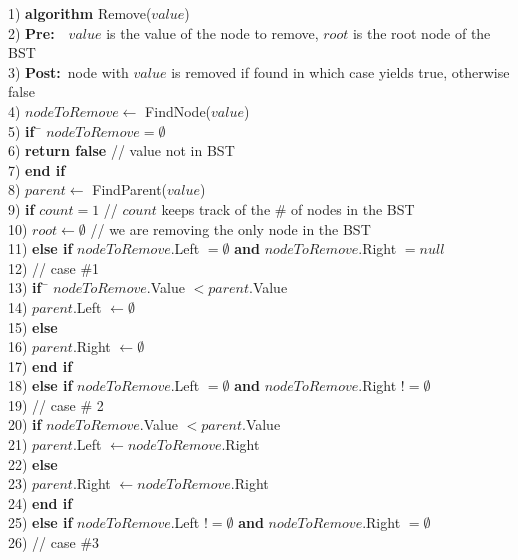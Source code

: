\begin{tabbing}
1)  \textbf{alg}\= \textbf{orithm} Remove($value$) \\
2)  \> \textbf{Pre:}~~$value$ is the value of the node to remove, $root$ is the root node of the BST \\
3)  \> \textbf{Post:}~node with $value$ is removed if found in which case yields true, otherwise false \\
4)  \> $nodeToRemove \leftarrow$ FindNode($value$) \\
5)  \> \textbf{if}~\= $nodeToRemove = \emptyset$ \\
6)  \> \> \textbf{return false} // value not in BST \\
7)  \> \textbf{end if} \\
8)  \> $parent \leftarrow$ FindParent($value$) \\
9)  \> \textbf{if} $count = 1$ // $count$ keeps track of the \# of nodes in the BST \\
10) \> \> $root \leftarrow \emptyset$ // we are removing the only node in the BST \\
11) \> \textbf{else if} $nodeToRemove$.Left $= \emptyset$ \textbf{and} $nodeToRemove$.Right $= null$ \\
12) \> \> // case \#1 \\
13) \> \> \textbf{if}~\= $nodeToRemove$.Value $< parent$.Value \\
14) \> \> \> $parent$.Left $\leftarrow \emptyset$ \\
15) \> \> \textbf{else} \\
16) \> \> \> $parent$.Right $\leftarrow \emptyset$ \\
17) \> \> \textbf{end if} \\
18) \> \textbf{else if} $nodeToRemove$.Left $= \emptyset$ \textbf{and} $nodeToRemove$.Right $!= \emptyset$ \\
19) \> \> // case \# 2 \\
20) \> \> \textbf{if} $nodeToRemove$.Value $< parent$.Value \\
21) \> \> \> $parent$.Left $\leftarrow nodeToRemove$.Right \\
22) \> \> \textbf{else} \\
23) \> \> \> $parent$.Right $\leftarrow nodeToRemove$.Right \\
24) \> \> \textbf{end if} \\
25) \> \textbf{else if} $nodeToRemove$.Left $!= \emptyset$ \textbf{and} $nodeToRemove$.Right $= \emptyset$ \\
26) \> \> // case \#3 \\

\end{tabbing}
